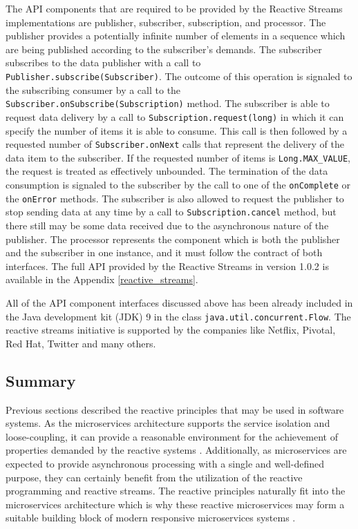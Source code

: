 \documentclass[oneside,
  digital, %
  table,   %
  lof,     %
  lot,     %
]{fithesis3}
\begin{document}
The API components that are required to be provided by the Reactive Streams implementations are publisher, subscriber, subscription, and processor. The publisher provides a potentially infinite number of elements in a sequence which are being published according to the subscriber's demands. The subscriber subscribes to the data publisher with a call to \texttt{Publisher.subscribe(Subscriber)}. The outcome of this operation is signaled to the subscribing consumer by a call to the \texttt{Subscriber.onSubscribe(Subscription)} method. The subscriber is able to request data delivery by a call to \texttt{Subscription.request(long)} in which it can specify the number of items it is able to consume. This call is then followed by a requested number of \texttt{Subscriber.onNext} calls that represent the delivery of the data item to the subscriber. If the requested number of items is \texttt{Long.MAX\_VALUE}, the request is treated as effectively unbounded. The termination of the data consumption is signaled to the subscriber by the call to one of the \texttt{onComplete} or the \texttt{onError} methods. The subscriber is also allowed to request the publisher to stop sending data at any time by a call to \texttt{Subscription.cancel} method, but there still may be some data received due to the asynchronous nature of the publisher. The processor represents the component which is both the publisher and the subscriber in one instance, and it must follow the contract of both interfaces. The full API provided by the Reactive Streams in version 1.0.2 is available in the Appendix \ref{reactive_streams}.

All of the API component interfaces discussed above has been already included in the Java development kit (JDK) 9 in the class \texttt{java.util.concurrent.Flow}. The reactive streams initiative is supported by the companies like Netflix, Pivotal, Red Hat, Twitter and many others.

\subsection{Summary}

Previous sections described the reactive principles that may be used in software systems. As the microservices architecture supports the service isolation and loose-coupling, it can provide a reasonable environment for the achievement of properties demanded by the reactive systems \cite{reactive_manifesto}. Additionally, as microservices are expected to provide asynchronous processing with a single and well-defined purpose, they can certainly benefit from the utilization of the reactive programming and reactive streams. The reactive principles naturally fit into the microservices architecture which is why these reactive microservices may form a suitable building block of modern responsive microservices systems \cite{building_reactive_ms_in_java}.
\end{document}
